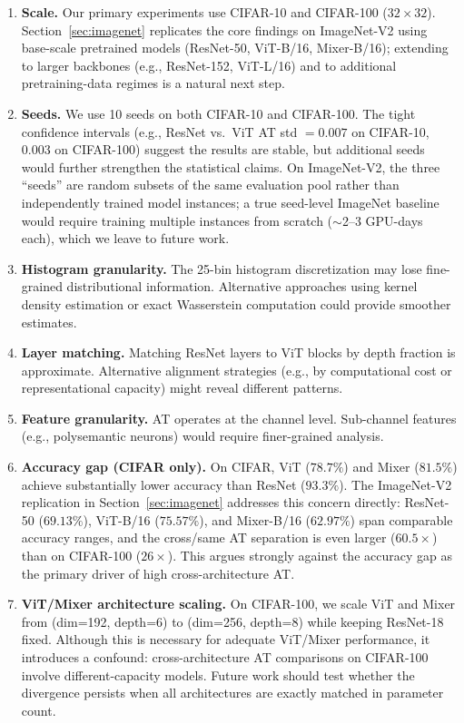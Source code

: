 \documentclass{article}
\begin{document}
\begin{enumerate}
    \item \textbf{Scale.} Our primary experiments use CIFAR-10 and CIFAR-100 ($32 \times 32$). Section~\ref{sec:imagenet} replicates the core findings on ImageNet-V2 using base-scale pretrained models (ResNet-50, ViT-B/16, Mixer-B/16); extending to larger backbones (e.g., ResNet-152, ViT-L/16) and to additional pretraining-data regimes is a natural next step.
    \item \textbf{Seeds.} We use 10 seeds on both CIFAR-10 and CIFAR-100. The tight confidence intervals (e.g., ResNet vs.\ ViT AT std $= 0.007$ on CIFAR-10, $0.003$ on CIFAR-100) suggest the results are stable, but additional seeds would further strengthen the statistical claims. On ImageNet-V2, the three ``seeds'' are random subsets of the same evaluation pool rather than independently trained model instances; a true seed-level ImageNet baseline would require training multiple instances from scratch ($\sim$2--3 GPU-days each), which we leave to future work.
    \item \textbf{Histogram granularity.} The 25-bin histogram discretization may lose fine-grained distributional information. Alternative approaches using kernel density estimation or exact Wasserstein computation could provide smoother estimates.
    \item \textbf{Layer matching.} Matching ResNet layers to ViT blocks by depth fraction is approximate. Alternative alignment strategies (e.g., by computational cost or representational capacity) might reveal different patterns.
    \item \textbf{Feature granularity.} AT operates at the channel level. Sub-channel features (e.g., polysemantic neurons) would require finer-grained analysis.
    \item \textbf{Accuracy gap (CIFAR only).} On CIFAR, ViT ($78.7\%$) and Mixer ($81.5\%$) achieve substantially lower accuracy than ResNet ($93.3\%$). The ImageNet-V2 replication in Section~\ref{sec:imagenet} addresses this concern directly: ResNet-50 ($69.13\%$), ViT-B/16 ($75.57\%$), and Mixer-B/16 ($62.97\%$) span comparable accuracy ranges, and the cross/same AT separation is even larger ($60.5\times$) than on CIFAR-100 ($26\times$). This argues strongly against the accuracy gap as the primary driver of high cross-architecture AT.
    \item \textbf{ViT/Mixer architecture scaling.} On CIFAR-100, we scale ViT and Mixer from (dim=192, depth=6) to (dim=256, depth=8) while keeping ResNet-18 fixed. Although this is necessary for adequate ViT/Mixer performance, it introduces a confound: cross-architecture AT comparisons on CIFAR-100 involve different-capacity models. Future work should test whether the divergence persists when all architectures are exactly matched in parameter count.
\end{enumerate}
\end{document}
